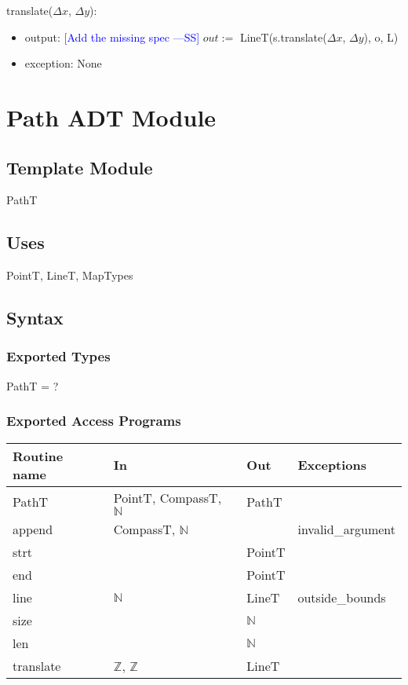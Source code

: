 \documentclass[12pt]{article}
\newcommand{\authornote}[3]{\textcolor{#1}{[#3 ---#2]}}
\newcommand{\authornote}[3]{}
\newcommand{\wss}[1]{\authornote{blue}{SS}{#1}}
\begin{document}
\noindent translate($\Delta x$, $\Delta y$):
\begin{itemize}
\item output: \wss{Add the missing spec} $out :=$ LineT(s.translate($\Delta x$, $\Delta y$), o, L) 
\item exception: None
\end{itemize}

\newpage

\section* {Path ADT Module}

\subsection*{Template Module}

PathT

\subsection* {Uses}

PointT, LineT, MapTypes

\subsection* {Syntax}

\subsubsection* {Exported Types}

PathT = ?

\subsubsection* {Exported Access Programs}

\begin{tabular}{| l | l | l | l |}
\hline
\textbf{Routine name} & \textbf{In} & \textbf{Out} & \textbf{Exceptions}\\
\hline
PathT & PointT, CompassT, $\mathbb{N}$ & PathT & \\ %
\hline
append & CompassT, $\mathbb{N}$ & & invalid\_argument\\ 
\hline
strt & ~ & PointT & ~\\
\hline
end & ~ & PointT & ~\\
\hline
line & $\mathbb{N}$ & LineT & outside\_bounds\\
\hline
size & ~ & $\mathbb{N}$ & \\
\hline
 len & ~ & $\mathbb{N}$ & ~\\
\hline
translate & $\mathbb{Z}$, $\mathbb{Z}$ & LineT  & ~\\
\hline
\end{tabular}
\end{document}
